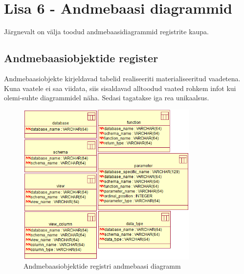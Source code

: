 \documentclass[a4paper,12pt]{article} %
\begin{document}
\section*{Lisa 6 - Andmebaasi diagrammid}
\label{lisa_andmebaasi_diagrammid}
Järgnevalt on välja toodud andmebaasidiagrammid registrite kaupa.


\subsection*{Andmebaasiobjektide register}
Andmebaasiobjekte kirjeldavad tabelid realiseeriti materialiseeritud vaadetena. Kuna vaatele ei saa viidata, siis sisaldavad alltoodud vaated rohkem infot kui olemi-suhte diagrammidel näha. Sedasi tagatakse iga rea unikaalsus.
\begin{figure}[H]
\centering
\includegraphics[width=0.8\textwidth]{./diagrams/database-object-db-diagram.png}
\caption{Andmebaasiobjektide registri andmebaasi diagramm}
\label{fig_andmebaasiobjektide_registri_andmebaasi_diagramm}
\end{figure}
\end{document}
